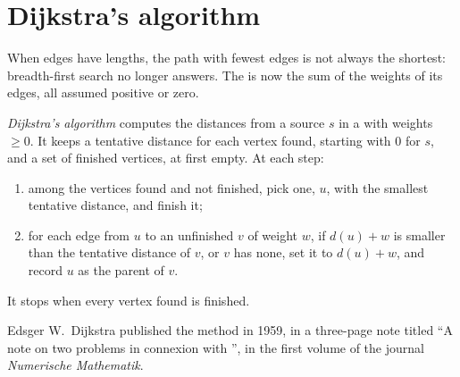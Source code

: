 \label{lst:g12:graph-algorithms:maze-run}

\label{out:g12:graph-algorithms:maze}

\section{Dijkstra's algorithm}\label{sec:g12:graph-algorithms:dijkstra}

When edges have lengths, the path with fewest edges is not always the shortest: breadth-first search no longer
answers. The  is now the sum of the weights of its edges, all assumed positive or zero.

\begin{method}\label{met:g12:graph-algorithms:dijkstra}
\emph{Dijkstra's algorithm} computes the distances from a source $s$ in a  with
weights $\ge 0$. It keeps a tentative distance for each vertex found, starting with $0$ for $s$, and a set of
finished vertices, at first empty. At each step:
\begin{enumerate}
  \item among the vertices found and not finished, pick one, $u$, with the smallest tentative distance, and finish it;
  \item for each edge from $u$ to an unfinished $v$ of weight $w$, if $d(u) + w$ is smaller than the tentative
    distance of $v$, or $v$ has none, set it to $d(u) + w$, and record $u$ as the parent of $v$.
\end{enumerate}
It stops when every vertex found is finished.
\end{method}

\begin{history}[Dijkstra, 1959]
Edsger W.\ Dijkstra published the method in 1959, in a three-page note titled ``A note on two problems in connexion
with '', in the first volume of the journal \emph{Numerische Mathematik}.
\end{history}

\label{lst:g12:graph-algorithms:dijkstra}

